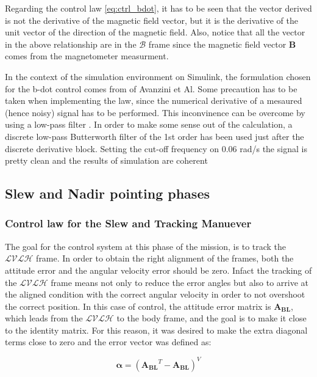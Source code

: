 Regarding the control law \autoref{eq:ctrl_bdot}, it has to be seen that the vector derived is not the derivative of the magnetic field vector, but it is the derivative of the unit vector of the 
direction of the magnetic field. Also, notice that all the vector in the above relationship are in the $\mathcal{B}$ frame since the magnetic 
field vector $\boldsymbol{B}$ comes from the magnetometer measurment.

In the context of the simulation environment on Simulink, the formulation chosen for the b-dot control comes from \cite{bdot} of Avanzini et Al. Some precaution has to be taken
when implementing the law, since the numerical derivative of a mesaured (hence noisy) signal has to be performed. This inconvinence can be overcome by using a low-pass filter \cite{crass_book}.
In order to make some sense out of the calculation, a discrete low-pass Butterworth filter of the 1st order has been used just after the discrete derivative block. 
Setting the cut-off frequency on 0.06 rad/s the signal is pretty clean and the results of simulation are coherent


\subsection{Slew and Nadir pointing phases}
\label{subsec:slew_subsec}

\subsubsection{Control law for the Slew and Tracking Manuever}
\label{subsubsec:slew_nadir_law}

The goal for the control system at this phase of the mission, is to track the $\mathcal{LVLH}$ frame. In order to obtain the right alignment of the frames, both the attitude error and the angular velocity error should be zero. Infact the tracking of the $\mathcal{LVLH}$ frame means not only to reduce the error angles but also to arrive at the aligned condition with the correct angular velocity in order to not overshoot the correct position. In this case of control, the attitude error matrix is $\boldsymbol{A_{BL}}$, which leads from the $\mathcal{LVLH}$ to the body frame, and the goal is to make it close to the identity matrix. For this reason, it was desired to make the extra diagonal terms close to zero and the error vector was defined as:

\begin{equation} \label{eq:alpha}
    \boldsymbol{\alpha}=(\boldsymbol{A_{BL}}^T- \boldsymbol{A_{BL}})^V
\end{equation}

